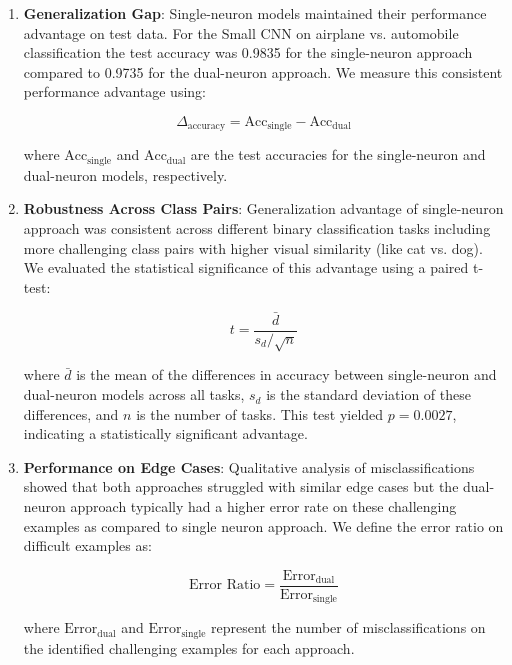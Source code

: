 \begin{enumerate}
\item \textbf{Generalization Gap}: Single-neuron models maintained their performance advantage on test data. For the Small CNN on airplane vs. automobile classification the test accuracy was 0.9835 for the single-neuron approach compared to 0.9735 for the dual-neuron approach. We measure this consistent performance advantage using:

\begin{equation}
\Delta_{\text{accuracy}} = \text{Acc}_{\text{single}} - \text{Acc}_{\text{dual}}
\end{equation}

where $\text{Acc}_{\text{single}}$ and $\text{Acc}_{\text{dual}}$ are the test accuracies for the single-neuron and dual-neuron models, respectively.

\item \textbf{Robustness Across Class Pairs}: Generalization advantage of single-neuron approach was consistent across different binary classification tasks including more challenging class pairs with higher visual similarity (like cat vs. dog). We evaluated the statistical significance of this advantage using a paired t-test:

\begin{equation}
 t = \frac{\bar{d}}{s_d / \sqrt{n}}
\end{equation}

where $\bar{d}$ is the mean of the differences in accuracy between single-neuron and dual-neuron models across all tasks, $s_d$ is the standard deviation of these differences, and $n$ is the number of tasks. This test yielded $p = 0.0027$, indicating a statistically significant advantage.

\item \textbf{Performance on Edge Cases}: Qualitative analysis of misclassifications showed that both approaches struggled with similar edge cases but the dual-neuron approach typically had a higher error rate on these challenging examples as compared to single neuron approach. We define the error ratio on difficult examples as:

\begin{equation}
\text{Error Ratio} = \frac{\text{Error}_{\text{dual}}}{\text{Error}_{\text{single}}}
\end{equation}

where $\text{Error}_{\text{dual}}$ and $\text{Error}_{\text{single}}$ represent the number of misclassifications on the identified challenging examples for each approach.
\end{enumerate}


